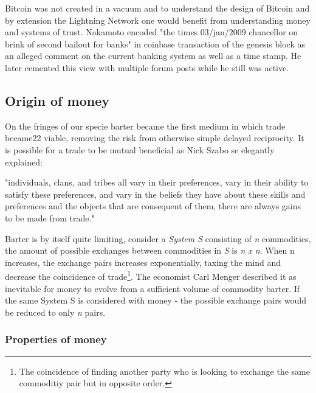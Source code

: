 Bitcoin was not created in a vacuum and to understand the design of Bitcoin and by extension the Lightning Network one would
benefit from understanding money and systems of trust. Nakamoto encoded "the times 03/jan/2009 chancellor on brink of second bailout for banks"\cite{repository:bitcoin:sourceforge}\cite{bitcoin:genesis:coinbase} in coinbase transaction of the genesis block as an alleged comment on the current banking system as well as a time stamp. He later cemented this view with multiple forum posts while he still was active.

\subsection{Origin of money}

On the fringes of our specie barter became the first
medium in which trade became22 viable, removing the risk 
from otherwise simple delayed reciprocity. It is possible
for a trade to be mutual beneficial as Nick Szabo 
se elegantly explained:

\begin{displayquote}

"individuals, clans, and tribes all vary in their preferences, vary in their ability to satisfy these preferences, and vary in the beliefs they have about these skills and preferences and the objects that are consequent of them, there are always gains to be made from trade."\cite{szabo:shelling:out}

\end{displayquote}

Barter is by itself quite limiting, consider a \textit{System S}
consisting of \textit{n} commodities, the amount of possible exchanges
between commodities in \textit{S} is \textit{n x n}. When n increases, the exchange pairs increases exponentially,
taxing the mind and decrease the coincidence of trade\footnote{The coincidence of finding another party who is looking to exchange the same commoditiy pair but in opposite order.}. 
The economist Carl Menger described it as inevitable for money to evolve from a sufficient volume of
commodity barter\cite{menger:origins:money}. If the same System S is considered with money - the possible exchange pairs would be reduced to only \textit{n} pairs. 

\subsubsection{Properties of money}

